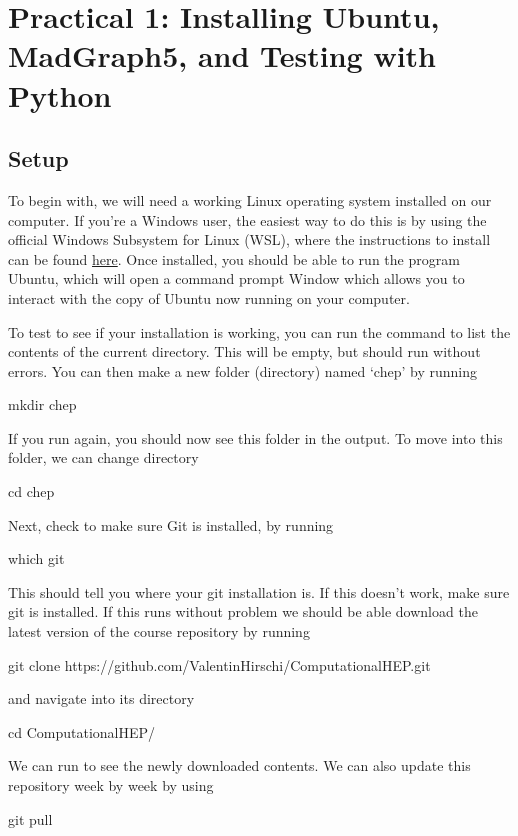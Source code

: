
\section*{Practical 1: Installing Ubuntu, MadGraph5, and Testing with Python}


\subsection*{Setup}
To begin with, we will need a working Linux operating system installed on our computer. If you're a Windows user, the easiest way to do this is by using the official Windows  Subsystem for Linux (WSL), where the instructions to install can be found \href{https://learn.microsoft.com/en-us/windows/wsl/install}{here}. Once installed, you should be able to run the program Ubuntu, which will open a command prompt Window which allows you to interact with the copy of Ubuntu now running on your computer.

To test to see if your installation is working, you can run the command  to list the contents of the current directory. This will be empty, but should run without errors. You can then make a new folder (directory) named `chep' by running
\begin{codeenv}
    mkdir chep
\end{codeenv}
If you run  again, you should now see this folder in the output. To move into this folder, we can change directory
\begin{codeenv}
    cd chep
\end{codeenv}
Next, check to make sure Git is installed, by running
\begin{codeenv}
    which git
\end{codeenv}
This should tell you where your git installation is. If this doesn't work, make sure git is installed.
If this runs without problem we should be able download the latest version of the course repository by running
\begin{codeenv}
    git clone https://github.com/ValentinHirschi/ComputationalHEP.git 
\end{codeenv}
and navigate into its directory
\begin{codeenv}
    cd ComputationalHEP/  
\end{codeenv}
We can run  to see the newly downloaded contents. We can also update this repository week by week by using
\begin{codeenv}
    git pull
\end{codeenv}

